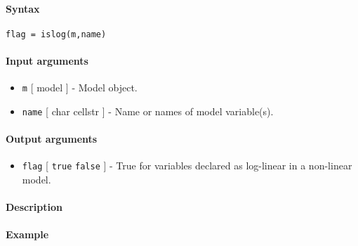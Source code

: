 


	\paragraph{Syntax}

\begin{verbatim}
flag = islog(m,name)
\end{verbatim}

\paragraph{Input arguments}

\begin{itemize}
\item
  \texttt{m} {[} model {]} - Model object.
\item
  \texttt{name} {[} char \textbar{} cellstr {]} - Name or names of model
  variable(s).
\end{itemize}

\paragraph{Output arguments}

\begin{itemize}
\itemsep1pt\parskip0pt
\item
  \texttt{flag} {[} \texttt{true} \textbar{} \texttt{false} {]} - True
  for variables declared as log-linear in a non-linear model.
\end{itemize}

\paragraph{Description}

\paragraph{Example}


